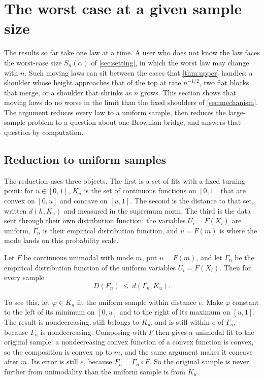 \section{The worst case at a given sample size}\label{sec:worst}

The results so far take one law at a time. A user who does not know the law faces the worst-case size $S_n(\alpha)$ of \cref{sec:setting}, in which the worst law may change with $n$. Such moving laws can sit between the cases that \cref{thm:upper} handles: a shoulder whose height approaches that of the top at rate $n^{-1/2}$, two flat blocks that merge, or a shoulder that shrinks as $n$ grows. This section shows that moving laws do no worse in the limit than the fixed shoulders of \cref{sec:mechanism}. The argument reduces every law to a uniform sample, then reduces the large-sample problem to a question about one Brownian bridge, and answers that question by computation.

\subsection{Reduction to uniform samples}
The reduction uses three objects. The first is a set of fits with a fixed turning point: for $u\in[0,1]$, $K_u$ is the set of continuous functions on $[0,1]$ that are convex on $[0,u]$ and concave on $[u,1]$. The second is the distance to that set, written $d(h,K_u)$ and measured in the supremum norm. The third is the data sent through their own distribution function: the variables $U_i=F(X_i)$ are uniform, $\Gamma_n$ is their empirical distribution function, and $u=F(m)$ is where the mode lands on this probability scale.

\begin{theorem}[domination]\label{thm:envelope}
Let $F$ be continuous unimodal with mode $m$, put $u=F(m)$, and let $\Gamma_n$ be the empirical distribution function of the uniform variables $U_i=F(X_i)$. Then for every sample
\[
D(F_n)\ \le\ d(\Gamma_n,K_u).
\]
\end{theorem}

To see this, let $\varphi\in K_u$ fit the uniform sample within distance $e$. Make $\varphi$ constant to the left of its minimum on $[0,u]$ and to the right of its maximum on $[u,1]$. The result is nondecreasing, still belongs to $K_u$, and is still within $e$ of $\Gamma_n$, because $\Gamma_n$ is nondecreasing. Composing with $F$ then gives a unimodal fit to the original sample: a nondecreasing convex function of a convex function is convex, so the composition is convex up to $m$, and the same argument makes it concave after $m$. Its error is still $e$, because $F_n=\Gamma_n\circ F$. So the original sample is never further from unimodality than the uniform sample is from $K_u$.

